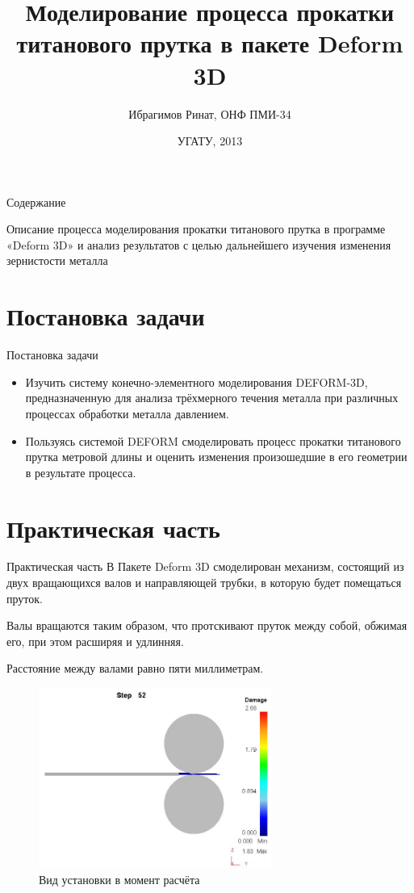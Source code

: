 \documentclass{beamer}
\begin{document}
\title{Моделирование процесса прокатки титанового прутка в пакете Deform 3D}  
\author{Ибрагимов Ринат, ОНФ ПМИ-34}
\date{УГАТУ, 2013}
\frame{\titlepage}
\begin{frame}{Содержание}
 \tableofcontents
\end{frame}
\begin{frame}{}
\transdissolve[duration=0.2]
 Описание процесса моделирования прокатки титанового прутка в программе «Deform 3D» и анализ результатов с целью дальнейшего изучения изменения зернистости  металла
\end{frame}
\section{Постановка задачи}
\begin{frame}{Постановка задачи}
 \transdissolve[duration=0.2]
 \begin{itemize}
  \item<1->  Изучить систему конечно-элементного моделирования DEFORM-3D, предназначенную для анализа трёхмерного течения металла при различных процессах обработки металла давлением.
  \item<2->  Пользуясь системой DEFORM смоделировать процесс прокатки титанового прутка метровой длины и оценить изменения произошедшие в его геометрии в результате процесса.
 \end{itemize}
\end{frame}
\section{Практическая часть}
\begin{frame}{Практическая часть}
\label{1.1}
В Пакете Deform 3D смоделирован механизм, состоящий из двух вращающихся валов и направляющей трубки, в которую будет помещаться пруток.

Валы вращаются таким образом, что протскивают пруток между собой, обжимая его, при этом расширяя и удлинняя.

Расстояние между валами равно пяти миллиметрам.
\end{frame}

\begin{frame}{}
\label{1.2}
\begin{figure}[h]
 \includegraphics[width=3in]{img/step52.JPG}
 \footnotesize\caption{Вид установки в момент расчёта}
\end{figure}
\end{frame}
\end{document}
